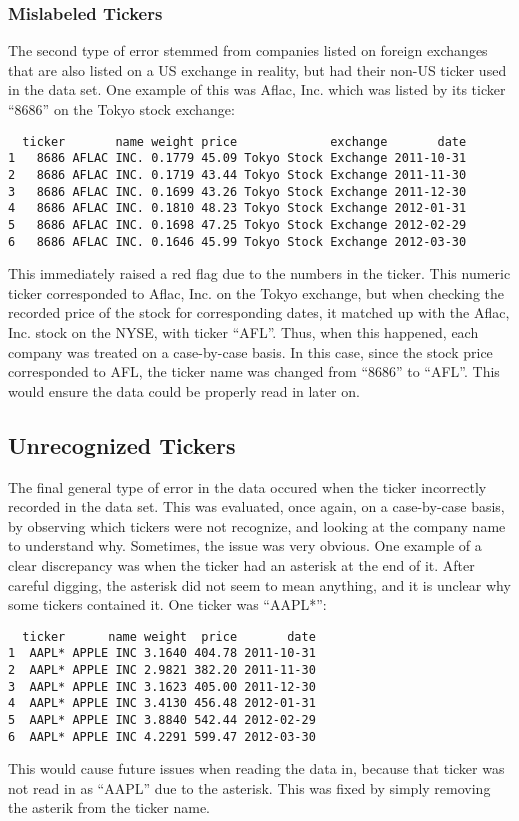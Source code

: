 \documentclass[12pt,twoside]{reedthesis}
\theoremstyle{definition}
\theoremstyle{definition}
\theoremstyle{definition}
\theoremstyle{remark}
\begin{document}
\subsubsection{Mislabeled Tickers}\label{mislabeled-tickers}

The second type of error stemmed from companies listed on foreign
exchanges that are also listed on a US exchange in reality, but had
their non-US ticker used in the data set. One example of this was Aflac,
Inc. which was listed by its ticker ``8686'' on the Tokyo stock
exchange:
\begin{verbatim}
  ticker       name weight price             exchange       date
1   8686 AFLAC INC. 0.1779 45.09 Tokyo Stock Exchange 2011-10-31
2   8686 AFLAC INC. 0.1719 43.44 Tokyo Stock Exchange 2011-11-30
3   8686 AFLAC INC. 0.1699 43.26 Tokyo Stock Exchange 2011-12-30
4   8686 AFLAC INC. 0.1810 48.23 Tokyo Stock Exchange 2012-01-31
5   8686 AFLAC INC. 0.1698 47.25 Tokyo Stock Exchange 2012-02-29
6   8686 AFLAC INC. 0.1646 45.99 Tokyo Stock Exchange 2012-03-30
\end{verbatim}
This immediately raised a red flag due to the numbers in the ticker.
This numeric ticker corresponded to Aflac, Inc. on the Tokyo exchange,
but when checking the recorded price of the stock for corresponding
dates, it matched up with the Aflac, Inc. stock on the NYSE, with ticker
``AFL''. Thus, when this happened, each company was treated on a
case-by-case basis. In this case, since the stock price corresponded to
AFL, the ticker name was changed from ``8686'' to ``AFL''. This would
ensure the data could be properly read in later on.

\subsection{Unrecognized Tickers}\label{unrecognized-tickers}

The final general type of error in the data occured when the ticker
incorrectly recorded in the data set. This was evaluated, once again, on
a case-by-case basis, by observing which tickers were not recognize, and
looking at the company name to understand why. Sometimes, the issue was
very obvious. One example of a clear discrepancy was when the ticker had
an asterisk at the end of it. After careful digging, the asterisk did
not seem to mean anything, and it is unclear why some tickers contained
it. One ticker was ``AAPL*'':
\begin{verbatim}
  ticker      name weight  price       date
1  AAPL* APPLE INC 3.1640 404.78 2011-10-31
2  AAPL* APPLE INC 2.9821 382.20 2011-11-30
3  AAPL* APPLE INC 3.1623 405.00 2011-12-30
4  AAPL* APPLE INC 3.4130 456.48 2012-01-31
5  AAPL* APPLE INC 3.8840 542.44 2012-02-29
6  AAPL* APPLE INC 4.2291 599.47 2012-03-30
\end{verbatim}
This would cause future issues when reading the data in, because that
ticker was not read in as ``AAPL'' due to the asterisk. This was fixed
by simply removing the asterik from the ticker name.
\end{document}
